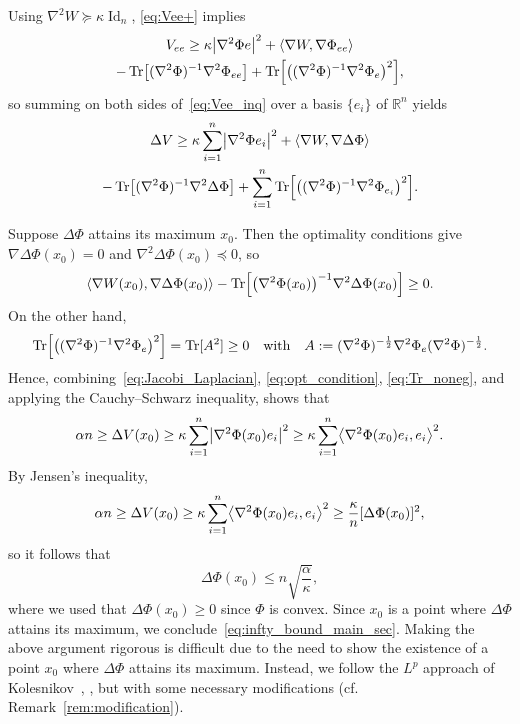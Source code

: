 \documentclass[AHL,Unicode,longabstracts]{cedram}
\newcommand{\R}{\mathbb R}
\DeclareMathOperator{\Id}{Id}
\DeclareMathOperator{\Tr}{Tr}
\newcommand{\V}{V}
\newcommand{\W}{W}
\newcommand{\dd}{n}
\newcommand{\lsh}{\alpha}
\newcommand{\lc}{\kappa}
\newcommand{\OT}{\Phi}
\let\originalleft\left
\let\originalright\right
\renewcommand{\left}{\mathopen{}\mathclose\bgroup\originalleft}
\renewcommand{\right}{\aftergroup\egroup\originalright}
\begin{document}
Using $\nabla^2\W\succeq \lc \Id_{\dd}$, \eqref{eq:Vee+} implies
\begin{multline}\label{eq:Vee_inq}
\V_{ee}\ge \lc\left|\nabla^2\OT e\right|^2+\langle \nabla\W,\nabla\OT_{ee}\rangle\\
-\Tr\left[(\nabla^2\OT)^{-1}\nabla^2\OT_{ee}\right]
+\Tr\left[\left((\nabla^2\OT)^{-1}\nabla^2\OT_e\right)^2\right],
\end{multline}
so summing on both sides of~\eqref{eq:Vee_inq} over a basis $\{e_i\}$ of $\R^{\dd}$ yields
\begin{multline}\label{eq:Jacobi_Laplacian}
\Delta \V\ge\lc \sum_{i=1}^{\dd}\left|\nabla^2\OT e_i\right|^2+ \langle \nabla\W,\nabla\Delta\OT\rangle\\
-\Tr\left[(\nabla^2\OT)^{-1}\nabla^2\Delta\OT\right]+\sum_{i=1}^{\dd}\Tr\left[\left((\nabla^2\OT)^{-1}\nabla^2\OT_{e_i}\right)^2\right].
\end{multline}



Suppose $\Delta\OT$ attains its maximum $x_0$. Then the optimality conditions give $\nabla \Delta\OT(x_0)=0$ and $\nabla^2\Delta\OT(x_0) \preceq 0$, so
\begin{equation}\label{eq:opt_condition}
\langle \nabla\W(x_0),\nabla\Delta\OT(x_0)\rangle-\Tr\left[\left(\nabla^2\OT(x_0)\right)^{-1}\nabla^2\Delta\OT(x_0)\right]\ge 0.
\end{equation}
On the other hand,
\begin{equation}\label{eq:Tr_noneg}
\Tr\left[\left((\nabla^2\OT)^{-1}\nabla^2\OT_e\right)^2\right]=\Tr[A^2]\ge 0\quad\text{with}\quad A:=(\nabla^2\OT)^{-\frac{1}{2}}\nabla^2\OT_e(\nabla^2\OT)^{-\frac{1}{2}}.
\end{equation}
Hence, combining~\eqref{eq:Jacobi_Laplacian}, \eqref{eq:opt_condition}, \eqref{eq:Tr_noneg}, and applying the Cauchy--Schwarz inequality, shows that
\begin{equation}\label{eq:main_inq_proof_e}
\lsh\dd\ge\Delta \V(x_0)\ge \lc \sum_{i=1}^{\dd}\left|\nabla^2\OT(x_0) e_i\right|^2\ge \kappa\sum_{i=1}^{\dd}\left\langle \nabla^2\OT(x_0)e_i,e_i\right\rangle^2.
\end{equation}
By Jensen's inequality,
\begin{equation}\label{eq:main_inq_proof}
\lsh\dd\ge\Delta \V(x_0)\ge \lc\sum_{i=1}^{\dd}\left\langle \nabla^2\OT(x_0)e_i,e_i\right\rangle^2\ge \frac{\lc}{\dd}[\Delta\OT(x_0)]^2,
\end{equation}
so it follows that
\begin{equation}\label{eq:OT_subharmonic}
\Delta\OT(x_0)\le \dd\sqrt{\frac{\lsh}{\lc}},
\end{equation}
where we used that $\Delta\OT(x_0)\ge 0$ since $\OT$ is convex. Since $x_0$ is a point where $\Delta\OT$ attains its maximum, we conclude~\eqref{eq:infty_bound_main_sec}. Making the above argument rigorous is difficult due to the need to show the existence of a point $x_0$ where $\Delta\OT$ attains its maximum. Instead, we follow the $L^p$ approach of Kolesnikov~\cite{MR3201654}, \cite[\S~6]{kolesnikov2011mass}, but with some necessary modifications (cf. Remark~\ref{rem:modification}).
\end{document}
